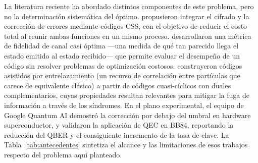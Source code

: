 \documentclass[12pt]{report}
\begin{document}
La literatura reciente ha abordado distintos componentes de este problema, pero
no la determinación sistemática del óptimo. \citet{jha2024} propusieron integrar
el cifrado y la corrección de errores mediante códigos CSS, con el objetivo de
reducir el costo total al reunir ambas funciones en un mismo proceso.
\citet{zheng2024} desarrollaron una métrica de fidelidad de canal casi óptima
—una medida de qué tan parecido llega el estado emitido al estado recibido— que
permite evaluar el desempeño de un código sin resolver problemas de optimización
costosos. \citet{matsui2025} construyeron códigos asistidos por entrelazamiento
(un recurso de correlación entre partículas que carece de equivalente clásico) a
partir de códigos cuasi-cíclicos con duales complementarios, cuyas propiedades
resultan relevantes para mitigar la fuga de información a través de los
síndromes. En el plano experimental, el equipo de Google Quantum AI
\citep{google2025} demostró la corrección por debajo del umbral en hardware
superconductor, y \citet{jayachandran2025} validaron la aplicación de QEC en
BB84, reportando la reducción del QBER y el consiguiente incremento de la tasa de
clave. La Tabla~\ref{tab:antecedentes} sintetiza el alcance y las limitaciones de
esos trabajos respecto del problema aquí planteado.
\end{document}
